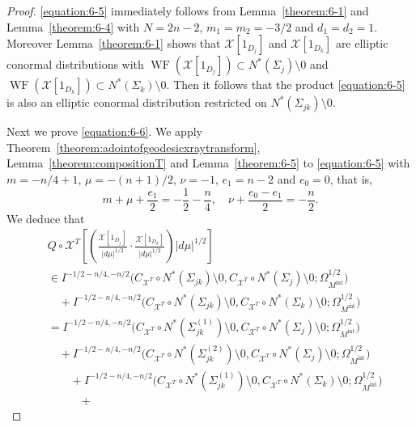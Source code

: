 \documentclass[a4paper,11pt,reqno]{amsart}
\numberwithin{equation}{section}
\theoremstyle{definition}
\theoremstyle{remark}
\begin{document}
\begin{proof}
\eqref{equation:6-5} immediately follows from 
Lemma~\ref{theorem:6-1} and Lemma~\ref{theorem:6-4} 
with $N=2n-2$, $m_1=m_2=-3/2$ and $d_1=d_2=1$. 
Moreover Lemma~\ref{theorem:6-1} shows that $\mathcal{X}[1_{D_j}]$ and $\mathcal{X}[1_{D_k}]$ are 
elliptic conormal distributions with 
$\operatorname{WF}(\mathcal{X}[1_{D_j}]) \subset N^\ast(\Sigma_j)\setminus0$ 
and 
$\operatorname{WF}(\mathcal{X}[1_{D_k}]) \subset N^\ast(\Sigma_k)\setminus0$. 
Then it follows that the product \eqref{equation:6-5} is also an elliptic conormal distribution 
restricted on $N^\ast(\Sigma_{jk})\setminus0$. 
%
%
\par
%
%
Next we prove \eqref{equation:6-6}. 
We apply 
Theorem~\ref{theorem:adointofgeodesicxraytransform},  
Lemma~\ref{theorem:compositionT} 
and  Lemma~\ref{theorem:6-5} to \eqref{equation:6-5} with 
$m=-n/4+1$, $\mu=-(n+1)/2$, $\nu=-1$, $e_1=n-2$ and $e_0=0$, that is, 
%
%
$$
m+\mu+\frac{e_1}{2}=-\frac{1}{2}-\frac{n}{4},
\quad
\nu+\frac{e_0-e_1}{2}=-\frac{n}{2}.           
$$
%
%
We deduce that
%
%
\begin{align*}
& Q{\circ}\mathcal{X}^T
  \left[
  \left(
  \frac{\mathcal{X}[1_{D_j}]}{\lvert{d\mu}\rvert^{1/2}}
  \cdot 
  \frac{\mathcal{X}[1_{D_k}]}{\lvert{d\mu}\rvert^{1/2}}
  \right)
  \lvert{d\mu}\rvert^{1/2}
  \right]
\\
& \in
  I^{-1/2-n/4, -n/2}
  \bigl(
  C_{\mathcal{X}^T}{\circ}N^\ast(\Sigma_{jk})\setminus0, 
  C_{\mathcal{X}^T}{\circ}N^\ast(\Sigma_j)\setminus0; 
  \Omega_{M^\text{int}}^{1/2}
  \bigr)
\\
& \quad +
  I^{-1/2-n/4, -n/2}
  \bigl(
  C_{\mathcal{X}^T}{\circ}N^\ast(\Sigma_{jk})\setminus0, 
  C_{\mathcal{X}^T}{\circ}N^\ast(\Sigma_k)\setminus0; 
  \Omega_{M^\text{int}}^{1/2}
  \bigr)
\\
& =
  I^{-1/2-n/4, -n/2}
  \bigl(
  C_{\mathcal{X}^T}{\circ}N^\ast(\Sigma_{jk}^{(1)})\setminus0, 
  C_{\mathcal{X}^T}{\circ}N^\ast(\Sigma_j)\setminus0; 
  \Omega_{M^\text{int}}^{1/2}
  \bigr)
\\
& \quad +
  I^{-1/2-n/4, -n/2}
  \bigl(
  C_{\mathcal{X}^T}{\circ}N^\ast(\Sigma_{jk}^{(2)})\setminus0, 
  C_{\mathcal{X}^T}{\circ}N^\ast(\Sigma_j)\setminus0; 
  \Omega_{M^\text{int}}^{1/2}
  \bigr)
\\
& \quad \quad +
  I^{-1/2-n/4, -n/2}
  \bigl(
  C_{\mathcal{X}^T}{\circ}N^\ast(\Sigma_{jk}^{(1)})\setminus0, 
  C_{\mathcal{X}^T}{\circ}N^\ast(\Sigma_k)\setminus0; 
  \Omega_{M^\text{int}}^{1/2}
  \bigr)
\\
& \quad \quad \quad +

\end{align*}
\end{proof}
\end{document}
